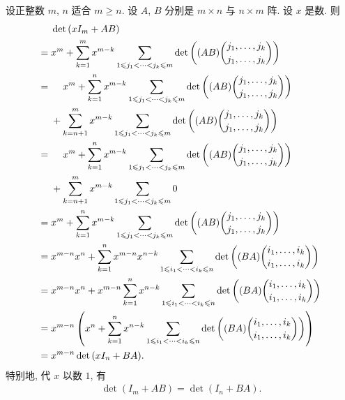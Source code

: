 \begin{example}
    设正整数 \(m\), \(n\) 适合 \(m \geq n\).
    设 \(A\), \(B\) 分别是 \(m \times n\) 与 \(n \times m\) 阵.
    设 \(x\) 是数.
    则
    \begin{align*}
             &
        \det {(xI_m + AB)}
        \\
        = {} &
        x^m
        + \sum_{k = 1}^{m}
        {x^{m-k}
        \sum_{1 \leq j_1 < \dots < j_k \leq m}
        \det {\left(
            (AB)\binom{j_1,\dots,j_k}{j_1,\dots,j_k}
            \right)}
        }
        \\
        = {} &
        \hphantom{{} + {}}
        x^m
        + \sum_{k = 1}^{n}
        {x^{m-k}
        \sum_{1 \leq j_1 < \dots < j_k \leq m}
        \det {\left(
            (AB)\binom{j_1,\dots,j_k}{j_1,\dots,j_k}
            \right)}
        }
        \\
             &
        + \sum_{k = n+1}^{m}
        {x^{m-k}
        \sum_{1 \leq j_1 < \dots < j_k \leq m}
        \det {\left(
            (AB)\binom{j_1,\dots,j_k}{j_1,\dots,j_k}
            \right)}
        }
        \\
        = {} &
        \hphantom{{} + {}}
        x^m
        + \sum_{k = 1}^{n}
        {x^{m-k}
        \sum_{1 \leq j_1 < \dots < j_k \leq m}
        \det {\left(
            (AB)\binom{j_1,\dots,j_k}{j_1,\dots,j_k}
            \right)}
        }
        \\
             &
        + \sum_{k = n+1}^{m}
        {x^{m-k}
        \sum_{1 \leq j_1 < \dots < j_k \leq m}
        0
        }
        \\
        = {} &
        x^m
        + \sum_{k = 1}^{n}
        {x^{m-k}
        \sum_{1 \leq j_1 < \dots < j_k \leq m}
        \det {\left(
            (AB)\binom{j_1,\dots,j_k}{j_1,\dots,j_k}
            \right)}
        }
        \\
        = {} &
        x^{m-n} x^n
        + \sum_{k = 1}^{n}
        {x^{m-n} x^{n-k}
        \sum_{1 \leq i_1 < \dots < i_k \leq n}
        \det {\left(
            (BA)\binom{i_1,\dots,i_k}{i_1,\dots,i_k}
            \right)}
        }
        \\
        = {} &
        x^{m-n} x^n
        + x^{m-n} \sum_{k = 1}^{n}
        {x^{n-k}
        \sum_{1 \leq i_1 < \dots < i_k \leq n}
        \det {\left(
            (BA)\binom{i_1,\dots,i_k}{i_1,\dots,i_k}
            \right)}
        }
        \\
        = {} &
        x^{m-n}
        \left(
        x^n
        + \sum_{k = 1}^{n}
        {x^{n-k}
            \sum_{1 \leq i_1 < \dots < i_k \leq n}
            \det {\left(
                (BA)\binom{i_1,\dots,i_k}{i_1,\dots,i_k}
                \right)}
        }
        \right)
        \\
        = {} &
        x^{m-n} \det {(xI_n + BA)}.
    \end{align*}
    特别地, 代 \(x\) 以数 \(1\), 有
    \begin{align*}
        \det {(I_m + AB)} = \det {(I_n + BA)}.
    \end{align*}
\end{example}

